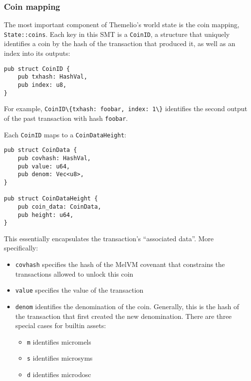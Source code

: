 \documentclass[
]{article}
\newcommand{\passthrough}[1]{#1}
\providecommand{\tightlist}{%
  \setlength{\itemsep}{0pt}\setlength{\parskip}{0pt}}
\begin{document}
\hypertarget{coin-mapping}{%
  \subsubsection{Coin mapping}\label{coin-mapping}}

The most important component of Themelio's world state is the coin
mapping, \passthrough{\lstinline!State::coins!}. Each key in this SMT is
a \passthrough{\lstinline!CoinID!}, a structure that uniquely identifies
a coin by the hash of the transaction that produced it, as well as an
index into its outputs:

\begin{lstlisting}
pub struct CoinID {
    pub txhash: HashVal,
    pub index: u8,
}
\end{lstlisting}

For example,
\passthrough{\lstinline!CoinID\{txhash: foobar, index: 1\}!} identifies
the second output of the past transaction with hash
\passthrough{\lstinline!foobar!}.

Each \passthrough{\lstinline!CoinID!} maps to a
\passthrough{\lstinline!CoinDataHeight!}:

\begin{lstlisting}
pub struct CoinData {
    pub covhash: HashVal,
    pub value: u64,
    pub denom: Vec<u8>,
}

pub struct CoinDataHeight {
    pub coin_data: CoinData,
    pub height: u64,
}
\end{lstlisting}

This essentially encapsulates the transaction's ``associated data''.
More specifically:

\begin{itemize}
  \tightlist
  \item
        \passthrough{\lstinline!covhash!} specifies the hash of the MelVM
        covenant that constrains the transactions allowed to unlock this coin
  \item
        \passthrough{\lstinline!value!} specifies the value of the transaction
  \item
        \passthrough{\lstinline!denom!} identifies the denomination of the
        coin. Generally, this is the hash of the transaction that first
        created the new denomination. There are three special cases for
        builtin assets:

        \begin{itemize}
          \tightlist
          \item
                \passthrough{\lstinline!m!} identifies micromels
          \item
                \passthrough{\lstinline!s!} identifies microsyms
          \item
                \passthrough{\lstinline!d!} identifies microdosc
        \end{itemize}
\end{itemize}
\end{document}
